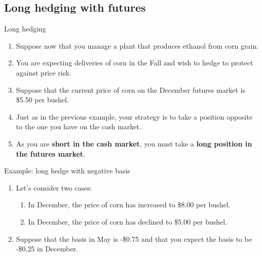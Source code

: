 \documentclass[table,xcolor=pdftex,dvipsnames]{beamer}\usepackage[]{graphicx}\usepackage[]{color}
\begin{document}
\subsection{Long hedging with futures}

\begin{frame}{Long hedging}
\begin{enumerate}[label=\textbullet]
  \item Suppose now that you manage a plant that produces ethanol from corn grain.
  \item You are expecting deliveries of corn in the Fall and wish to hedge to protect against price risk.
  \item Suppose that the current price of corn on the December futures market is \$5.50 per bushel.
  \item Just as in the previous example, your strategy is to take a position opposite to the one you have on the cash market.
  \item As you are \textbf{short in the cash market}, you must take a \textbf{long position in the futures market}.
\end{enumerate}
\end{frame}

\begin{frame}{Example: long hedge with negative basis}
\begin{enumerate}[label=\textbullet]
  \item Let's consider two cases:
      \begin{enumerate}[label=\arabic*)]
            \item In December, the price of corn has increased to \$8.00 per bushel.
            \item In December, the price of corn has declined to \$5.00 per bushel.
      \end{enumerate}
  \item Suppose that the basis in May is -\$0.75 and that you expect the basis to be -\$0.25 in December.
\end{enumerate}
\end{frame}

\end{document}

